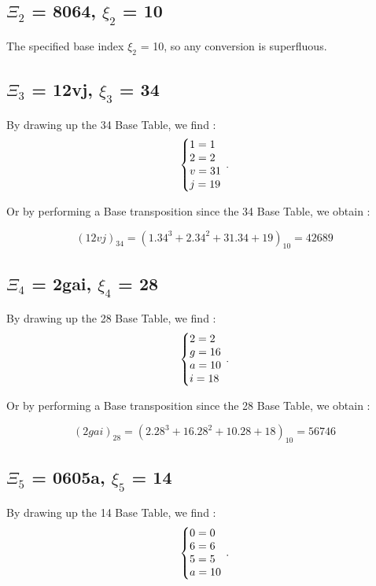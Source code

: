 \documentclass{article}
\begin{document}
\subsection{$\Xi_{2}$ = 8064, $\xi_{2}$ = 10}
The specified base index $\xi_{2}$ = 10, so any conversion is superfluous.


\subsection{$\Xi_{3}$ = 12vj, $\xi_{3}$ = 34}
By drawing up the 34 Base Table, we find :
\begin{equation}
\centering
\left\{\begin{array}{@{}l@{}}
1=1 \\
2=2 \\
v=31 \\
j=19 \\
\end{array}\right.\,.
\end{equation}

\begin{flushleft}
	Or by performing a Base transposition since the 34 Base Table, we obtain :
\end{flushleft}
\begin{equation}
(12vj)_{34}=(1.34^{3}+2.34^{2}+31.34+19)_{10}=42689
\end{equation}

\subsection{$\Xi_{4}$ = 2gai, $\xi_{4}$ = 28}
By drawing up the 28 Base Table, we find :
\begin{equation}
\centering
\left\{\begin{array}{@{}l@{}}
2=2 \\
g=16 \\
a=10 \\
i=18 \\
\end{array}\right.\,.
\end{equation}

\begin{flushleft}
	Or by performing a Base transposition since the 28 Base Table, we obtain :
\end{flushleft}
\begin{equation}
(2gai)_{28}=(2.28^{3}+16.28^{2}+10.28+18)_{10}=56746
\end{equation}

\subsection{$\Xi_{5}$ = 0605a, $\xi_{5}$ = 14}
By drawing up the 14 Base Table, we find :
\begin{equation}
\centering
\left\{\begin{array}{@{}l@{}}
0=0 \\
6=6 \\
5=5 \\
a=10 \\
\end{array}\right.\,.
\end{equation}
\end{document}

